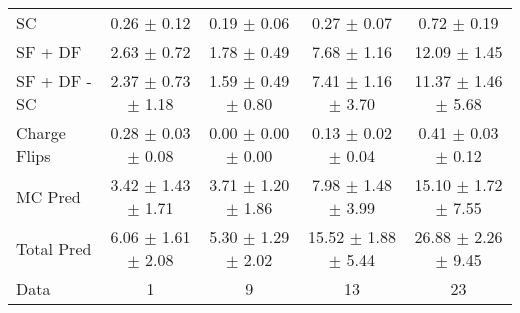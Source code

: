 \begin{tabular}{l|cccc}
                                 SC &  0.26 $\pm$  0.12 &  0.19 $\pm$  0.06 &  0.27 $\pm$  0.07 &  0.72 $\pm$  0.19 \\
                            SF + DF &  2.63 $\pm$  0.72 &  1.78 $\pm$  0.49 &  7.68 $\pm$  1.16 & 12.09 $\pm$  1.45 \\
\hline
                       SF + DF - SC &  2.37 $\pm$  0.73 $\pm$  1.18 &  1.59 $\pm$  0.49 $\pm$  0.80 &  7.41 $\pm$  1.16 $\pm$  3.70 & 11.37 $\pm$  1.46 $\pm$  5.68 \\
\hline\hline
                       Charge Flips &  0.28 $\pm$  0.03 $\pm$  0.08 &  0.00 $\pm$  0.00 $\pm$  0.00 &  0.13 $\pm$  0.02 $\pm$  0.04 &  0.41 $\pm$  0.03 $\pm$  0.12 \\
\hline
                            MC Pred &  3.42 $\pm$  1.43 $\pm$  1.71 &  3.71 $\pm$  1.20 $\pm$  1.86 &  7.98 $\pm$  1.48 $\pm$  3.99 & 15.10 $\pm$  1.72 $\pm$  7.55 \\
\hline
                         Total Pred &  6.06 $\pm$  1.61 $\pm$  2.08 &  5.30 $\pm$  1.29 $\pm$  2.02 & 15.52 $\pm$  1.88 $\pm$  5.44 & 26.88 $\pm$  2.26 $\pm$  9.45 \\
\hline\hline
                               Data &     1 &     9 &    13 &    23 \\
\hline\hline
\end{tabular}

